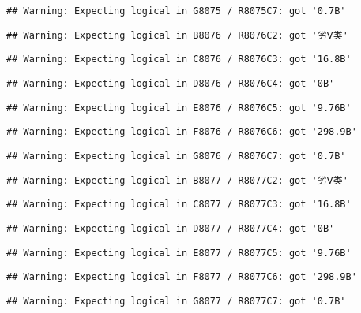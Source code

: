 \documentclass[
]{article}
\begin{document}
\begin{verbatim}
## Warning: Expecting logical in G8075 / R8075C7: got '0.7B'
\end{verbatim}

\begin{verbatim}
## Warning: Expecting logical in B8076 / R8076C2: got '劣Ⅴ类'
\end{verbatim}

\begin{verbatim}
## Warning: Expecting logical in C8076 / R8076C3: got '16.8B'
\end{verbatim}

\begin{verbatim}
## Warning: Expecting logical in D8076 / R8076C4: got '0B'
\end{verbatim}

\begin{verbatim}
## Warning: Expecting logical in E8076 / R8076C5: got '9.76B'
\end{verbatim}

\begin{verbatim}
## Warning: Expecting logical in F8076 / R8076C6: got '298.9B'
\end{verbatim}

\begin{verbatim}
## Warning: Expecting logical in G8076 / R8076C7: got '0.7B'
\end{verbatim}

\begin{verbatim}
## Warning: Expecting logical in B8077 / R8077C2: got '劣Ⅴ类'
\end{verbatim}

\begin{verbatim}
## Warning: Expecting logical in C8077 / R8077C3: got '16.8B'
\end{verbatim}

\begin{verbatim}
## Warning: Expecting logical in D8077 / R8077C4: got '0B'
\end{verbatim}

\begin{verbatim}
## Warning: Expecting logical in E8077 / R8077C5: got '9.76B'
\end{verbatim}

\begin{verbatim}
## Warning: Expecting logical in F8077 / R8077C6: got '298.9B'
\end{verbatim}

\begin{verbatim}
## Warning: Expecting logical in G8077 / R8077C7: got '0.7B'
\end{verbatim}
\end{document}
